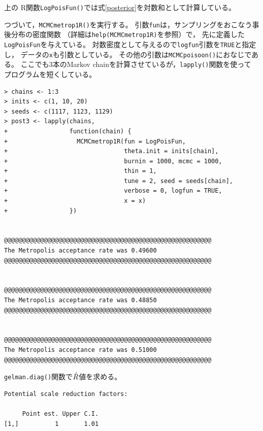 \documentclass[11pt,uplatex]{jsarticle}
\begin{document}
\noindent
上の \textsf{R}関数\texttt{LogPoisFun()}では式\ref{posterior}を対数和として計算している。

つづいて，\texttt{MCMCmetrop1R()}を実行する。
引数\texttt{fun}は，サンプリングをおこなう事後分布の密度関数
（詳細は\texttt{help(MCMCmetrop1R)}を参照）で，
先に定義した\texttt{LogPoisFun}を与えている。
対数密度として与えるので\texttt{logfun}引数を\texttt{TRUE}と指定し，
データの\texttt{x}も引数としている。
その他の引数は\texttt{MCMCpoisoon()}におなじである。
ここでも3本のMarkov chainを計算させているが，\texttt{lapply()}関数を使って
プログラムを短くしている。

\vspace{1zw}
\begin{lstlisting}
> chains <- 1:3
> inits <- c(1, 10, 20)
> seeds <- c(1117, 1123, 1129)
> post3 <- lapply(chains,
+                 function(chain) {
+                   MCMCmetrop1R(fun = LogPoisFun,
+                                theta.init = inits[chain],
+                                burnin = 1000, mcmc = 1000,
+                                thin = 1,
+                                tune = 2, seed = seeds[chain],
+                                verbose = 0, logfun = TRUE,
+                                x = x)
+                 })


@@@@@@@@@@@@@@@@@@@@@@@@@@@@@@@@@@@@@@@@@@@@@@@@@@@@@@@@@
The Metropolis acceptance rate was 0.49600
@@@@@@@@@@@@@@@@@@@@@@@@@@@@@@@@@@@@@@@@@@@@@@@@@@@@@@@@@


@@@@@@@@@@@@@@@@@@@@@@@@@@@@@@@@@@@@@@@@@@@@@@@@@@@@@@@@@
The Metropolis acceptance rate was 0.48850
@@@@@@@@@@@@@@@@@@@@@@@@@@@@@@@@@@@@@@@@@@@@@@@@@@@@@@@@@


@@@@@@@@@@@@@@@@@@@@@@@@@@@@@@@@@@@@@@@@@@@@@@@@@@@@@@@@@
The Metropolis acceptance rate was 0.51000
@@@@@@@@@@@@@@@@@@@@@@@@@@@@@@@@@@@@@@@@@@@@@@@@@@@@@@@@@
\end{lstlisting}

\texttt{gelman.diag()}関数で$\Hat{R}$値を求める。
\vspace{2zw}
\begin{lstlisting}
Potential scale reduction factors:

     Point est. Upper C.I.
[1,]          1       1.01

\end{lstlisting}
\end{document}
